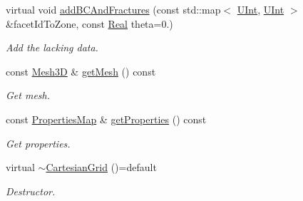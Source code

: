 \begin{DoxyCompactItemize}
virtual void \hyperlink{classFVCode3D_1_1CartesianGrid_ac8dc7df2cf0ff329b495db228c58002b}{add\+B\+C\+And\+Fractures} (const std\+::map$<$ \hyperlink{namespaceFVCode3D_a4bf7e328c75d0fd504050d040ebe9eda}{U\+Int}, \hyperlink{namespaceFVCode3D_a4bf7e328c75d0fd504050d040ebe9eda}{U\+Int} $>$ \&facet\+Id\+To\+Zone, const \hyperlink{namespaceFVCode3D_a40c1f5588a248569d80aa5f867080e83}{Real} theta=0.)
\begin{DoxyCompactList}\small\item\em Add the lacking data. \end{DoxyCompactList}\item 
const \hyperlink{classFVCode3D_1_1Mesh3D}{Mesh3D} \& \hyperlink{classFVCode3D_1_1CartesianGrid_af554d97975d562c7242cc295bfcc8435}{get\+Mesh} () const 
\begin{DoxyCompactList}\small\item\em Get mesh. \end{DoxyCompactList}\item 
const \hyperlink{classFVCode3D_1_1PropertiesMap}{Properties\+Map} \& \hyperlink{classFVCode3D_1_1CartesianGrid_a034449ac6050034dcc07645ab2de81c4}{get\+Properties} () const 
\begin{DoxyCompactList}\small\item\em Get properties. \end{DoxyCompactList}\item 
virtual \hyperlink{classFVCode3D_1_1CartesianGrid_afc2fff60f19e4f066c80298f3b5d45f6}{$\sim$\+Cartesian\+Grid} ()=default
\begin{DoxyCompactList}\small\item\em Destructor. \end{DoxyCompactList}\end{DoxyCompactItemize}
